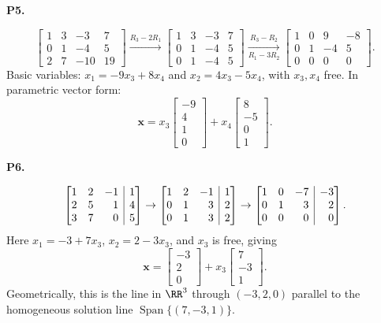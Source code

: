 \documentclass[10pt]{scrartcl}
\makeatletter
\newcommand{\aug}[2]{\left[\begin{array}{@{}#1@{}}#2\end{array}\right]}
\newcommand{\vv}[1]{\mathbf{#1}}
\DeclareMathOperator{\spn}{Span}
\makeatother
\begin{document}
\begin{prob}\textbf{P5.}\par{}
\[
  \begin{bmatrix}1&3&-3&7\\0&1&-4&5\\2&7&-10&19\end{bmatrix}
  \xrightarrow{R_3-2R_1} \begin{bmatrix}1&3&-3&7\\0&1&-4&5\\0&1&-4&5\end{bmatrix}
  \xrightarrow[R_1-3R_2]{R_3-R_2} \begin{bmatrix}1&0&9&-8\\0&1&-4&5\\0&0&0&0\end{bmatrix}.
\]
Basic variables: $x_1=-9x_3+8x_4$ and $x_2=4x_3-5x_4$, with $x_3,x_4$ free. In parametric vector form:
\[
  \vv x = x_3\begin{bmatrix}-9\\4\\1\\0\end{bmatrix} + x_4\begin{bmatrix}8\\-5\\0\\1\end{bmatrix}.
\]
\end{prob}

\begin{prob}\textbf{P6.}\par{}
\[
  \aug{rrr|r}{1&2&-1&1\\2&5&1&4\\3&7&0&5}\to\aug{rrr|r}{1&2&-1&1\\0&1&3&2\\0&1&3&2}\to\aug{rrr|r}{1&0&-7&-3\\0&1&3&2\\0&0&0&0}.
\]
Here $x_1=-3+7x_3$, $x_2=2-3x_3$, and $x_3$ is free, giving
\[
  \vv x = \begin{bmatrix}-3\\2\\0\end{bmatrix} + x_3\begin{bmatrix}7\\-3\\1\end{bmatrix}.
\]
Geometrically, this is the line in $\RR^3$ through $(-3,2,0)$ parallel to the homogeneous solution line $\spn\{(7,-3,1)\}$.
\end{prob}
\end{document}
